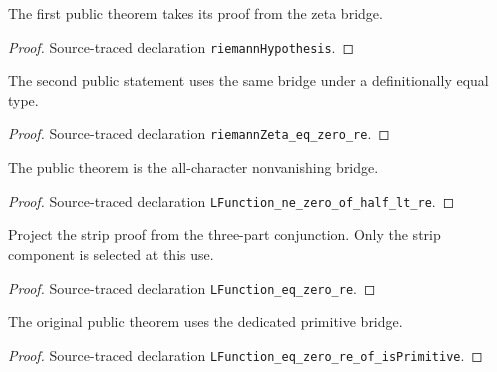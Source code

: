 {\begin{theorem}
\label{mainRH}
The first public theorem takes its proof from the zeta bridge.
\end{theorem}
\begin{proof}
Source-traced declaration \texttt{riemannHypothesis}.
\end{proof}


\begin{theorem}
\label{mainZeta}
The second public statement uses the same bridge under a definitionally equal type.
\end{theorem}
\begin{proof}
Source-traced declaration \texttt{riemannZeta\_eq\_zero\_re}.
\end{proof}


\begin{theorem}
\label{mainNV}
The public theorem is the all-character nonvanishing bridge.
\end{theorem}
\begin{proof}
Source-traced declaration \texttt{LFunction\_ne\_zero\_of\_half\_lt\_re}.
\end{proof}


\begin{theorem}
\label{mainStrip}
Project the strip proof from the three-part conjunction. Only the strip component is selected at this use.
\end{theorem}
\begin{proof}
Source-traced declaration \texttt{LFunction\_eq\_zero\_re}.
\end{proof}


\begin{theorem}
\label{mainPrim}
The original public theorem uses the dedicated primitive bridge.
\end{theorem}
\begin{proof}
Source-traced declaration \texttt{LFunction\_eq\_zero\_re\_of\_isPrimitive}.
\end{proof}

}